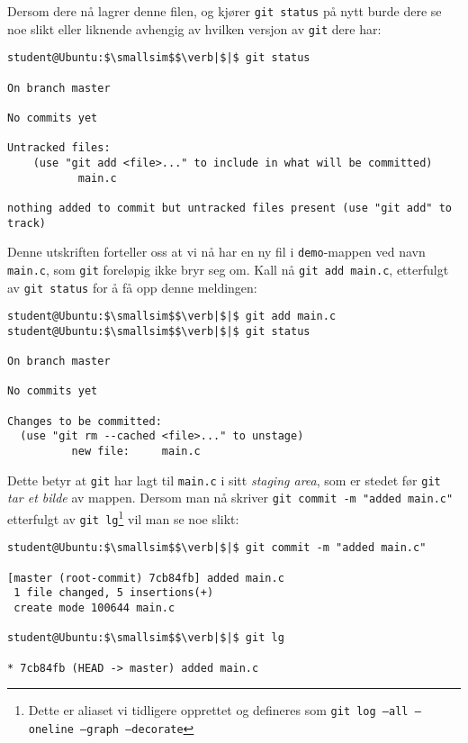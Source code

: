 \begin{alphasection}
Dersom dere nå lagrer denne filen, og kjører \verb|git status| på nytt burde dere se noe slikt eller liknende avhengig av hvilken versjon av \verb|git| dere har:

\begin{lstlisting}[mathescape=true]
student@Ubuntu:$\smallsim$$\verb|$|$ git status

On branch master

No commits yet

Untracked files:
    (use "git add <file>..." to include in what will be committed)
           main.c

nothing added to commit but untracked files present (use "git add" to track)
\end{lstlisting}

Denne utskriften forteller oss at vi nå har en ny fil i \verb|demo|-mappen ved navn \verb|main.c|, som \verb|git| foreløpig ikke bryr seg om. Kall nå \verb|git add main.c|, etterfulgt av \verb|git status| for å få opp denne meldingen:

\begin{lstlisting}[mathescape=true]
student@Ubuntu:$\smallsim$$\verb|$|$ git add main.c
student@Ubuntu:$\smallsim$$\verb|$|$ git status

On branch master

No commits yet

Changes to be committed:
  (use "git rm --cached <file>..." to unstage)
	      new file:     main.c
\end{lstlisting}

Dette betyr at \verb|git| har lagt til \verb|main.c| i sitt \textit{staging area}, som er stedet før \verb|git| \textit{tar et bilde} av mappen. Dersom man nå skriver \verb|git commit -m "added main.c"| etterfulgt av \verb|git lg|\footnote{Dette er aliaset vi tidligere opprettet og defineres som \texttt{git log --all --oneline --graph --decorate}} vil man se noe slikt:

\begin{lstlisting}[mathescape=true]
student@Ubuntu:$\smallsim$$\verb|$|$ git commit -m "added main.c" 

[master (root-commit) 7cb84fb] added main.c
 1 file changed, 5 insertions(+)
 create mode 100644 main.c

student@Ubuntu:$\smallsim$$\verb|$|$ git lg

* 7cb84fb (HEAD -> master) added main.c
\end{lstlisting}





\end{alphasection}
